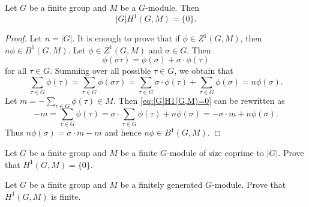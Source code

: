 \begin{theorem}
    Let $G$ be a finite group and $M$ be a $G$-module. 
    Then 
    \[
    |G|H^1(G,M)=\{0\}.
    \]
\end{theorem}

\begin{proof}
    Let $n=|G|$. It is enough to prove that 
    if $\phi\in Z^1(G,M)$, then $n\phi\in B^1(G,M)$. Let $\phi\in Z^1(G,M)$ and 
    $\sigma\in G$. Then 
    \[
    \phi(\sigma\tau)=\phi(\sigma)+\sigma\cdot\phi(\tau)
    \]
    for all $\tau\in G$. Summing over all possible $\tau\in G$, we obtain that 
    \begin{equation}
        \label{eq:|G|H1(G,M)=0}    
        \sum_{\tau\in G}\phi(\tau)=\sum_{\tau\in G}\phi(\sigma\tau)
        =\sum_{\tau\in G}\sigma\cdot\phi(\tau)+\sum_{\tau\in G}\phi(\sigma)=n\phi(\sigma).
    \end{equation}
    Let $m=-\sum_{\tau\in G}\phi(\tau)\in M$. Then 
    \eqref{eq:|G|H1(G,M)=0} can be rewritten as 
    \[
    -m=\sum_{\tau\in G}\phi(\tau)=\sigma\cdot \sum_{\tau\in G}\phi(\tau)+n\phi(\sigma)
    =-\sigma\cdot m+n\phi(\sigma).
    \]
    Thus $n\phi(\sigma)=\sigma\cdot m-m$ and hence $n\phi\in B^1(G,M)$.  
\end{proof}

\begin{exercise}
    Let $G$ be a finite group and 
    $M$ be a finite $G$-module of size coprime to $|G|$. Prove that 
    $H^1(G,M)=\{0\}$. 
\end{exercise}

\begin{exercise}
    Let $G$ be a finite group and 
    $M$ be a finitely generated $G$-module. Prove that
    $H^1(G,M)$ is finite.
\end{exercise}

%    
%


